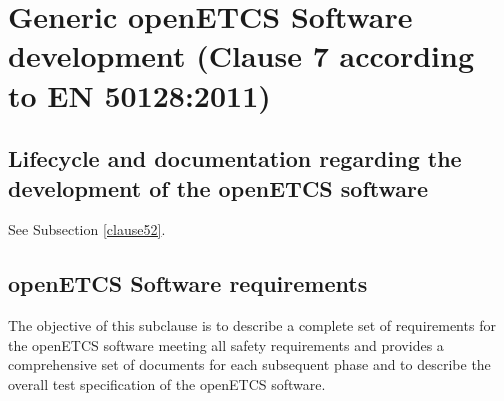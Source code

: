 \documentclass{template/openetcs_report}
\begin{document}
\section{Generic openETCS Software development (Clause 7 according to EN 50128:2011)}
\label{clause72}
\subsection{Lifecycle and documentation regarding the development of the openETCS software}
See Subsection \ref{clause52}.


\subsection{openETCS Software requirements}
\label{req-sw}
\begin{flushleft}
The objective of this subclause is to describe a complete set of requirements for the openETCS software meeting all safety requirements and provides a comprehensive set of documents for each subsequent phase and to describe the overall test specification of the openETCS software.
\end{flushleft}
\end{document}
